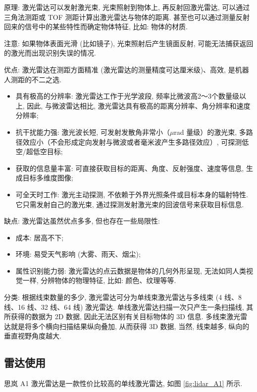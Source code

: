 \documentclass[openany, fontset=windowsold]{ctexbook}
\theoremstyle{kaiti}
\theoremstyle{normal}
\begin{document}
原理: 激光雷达可以发射激光束, 光束照射到物体上, 再反射回激光雷达, 可以通过三角法测距或 TOF 测距计算出激光雷达与物体的距离. 甚至也可以通过测量反射回来的信号中的某些特性而确定物体特征, 比如: 物体的材质.

注意: 如果物体表面光滑 (比如镜子), 光束照射后产生镜面反射, 可能无法捕获返回的激光而出现识别失误的情况.

优点: 激光雷达在测距方面精准 (激光雷达的测量精度可达厘米级)、高效, 是机器人测距的不二之选.

\begin{itemize}
  \item 具有极高的分辨率: 激光雷达工作于光学波段, 频率比微波高2～3个数量级以上, 因此, 与微波雷达相比, 激光雷达具有极高的距离分辨率、角分辨率和速度分辨率; 
  \item 抗干扰能力强: 激光波长短, 可发射发散角非常小（$\mu$rad 量级）的激光束, 多路径效应小（不会形成定向发射与微波或者毫米波产生多路径效应）, 可探测低空/超低空目标; 
  \item 获取的信息量丰富: 可直接获取目标的距离、角度、反射强度、速度等信息, 生成目标多维度图像; 
  \item 可全天时工作: 激光主动探测, 不依赖于外界光照条件或目标本身的辐射特性. 它只需发射自己的激光束, 通过探测发射激光束的回波信号来获取目标信息.
\end{itemize}

缺点: 激光雷达虽然优点多多, 但也存在一些局限性:

\begin{itemize}
  \item 成本: 居高不下;
  \item 环境: 易受天气影响 (大雾、雨天、烟尘);
  \item 属性识别能力弱: 激光雷达的点云数据是物体的几何外形呈现, 无法如同人类视觉一样, 分辨物体的物理特征, 比如: 颜色、纹理等等.
\end{itemize}

分类: 根据线束数量的多少, 激光雷达可分为单线束激光雷达与多线束 (4 线、8 线、16 线、32 线、64 线) 激光雷达. 单线激光雷达扫描一次只产生一条扫描线, 其所获得的数据为 2D 数据, 因此无法区别有关目标物体的 3D 信息. 多线束激光雷达就是将多个横向扫描结果纵向叠加, 从而获得 3D 数据, 当然, 线束越多, 纵向的垂直视野角度越大.

\subsection{雷达使用}

思岚 A1 激光雷达是一款性价比较高的单线激光雷达, 如图 \ref{fig:lidar_A1} 所示.
\end{document}
